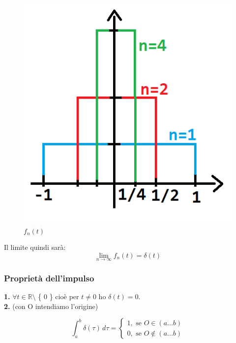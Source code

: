 	\begin{figure}[h]
		\centering
		\includegraphics[scale=0.5]{immagini/deltaSuccessione}
		\caption{ $ f_n(t) $ }
		\label{fig: deltaSuccessione}
	\end{figure}

	Il limite quindi sarà:\\
	\begin{equation*}
	\lim_{ n \rightarrow \infty} f_n(t) = \delta(t) 
	\end{equation*}

\subsubsection{Proprietà dell'impulso}

	\textbf{1. } $\forall t \in \mathbb{R} \setminus $ \{ $ 0 $ \} cioè per $ t \neq 0 $ ho $ \delta(t)=0 $. \\
	
	\textbf{2. } (con O intendiamo l'origine)
	
	\begin{equation*}
	\int_{ a}^{ b} \delta( \tau)  \, d\tau =
	\begin{cases} 
	1, \mbox{ se } O \in (a...b)\\
	0, \mbox{ se } O \notin (a...b)
	\end{cases} 
	\end{equation*}
	
